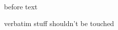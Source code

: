 before text
\begin{commandshell}
   verbatim
        stuff
shouldn't be touched
\end{commandshell}%
